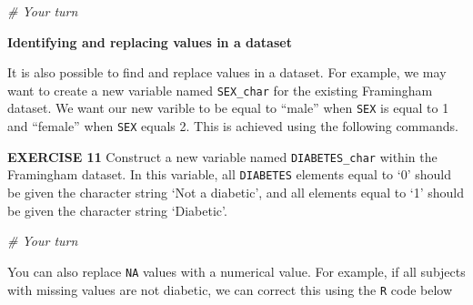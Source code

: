 \documentclass[
]{article}
\newenvironment{Shaded}{\begin{snugshade}}{\end{snugshade}}
\newcommand{\CommentTok}[1]{\textcolor[rgb]{0.56,0.35,0.01}{\textit{#1}}}
\newcommand{\DecValTok}[1]{\textcolor[rgb]{0.00,0.00,0.81}{#1}}
\newcommand{\FunctionTok}[1]{\textcolor[rgb]{0.00,0.00,0.00}{#1}}
\newcommand{\NormalTok}[1]{#1}
\newcommand{\OtherTok}[1]{\textcolor[rgb]{0.56,0.35,0.01}{#1}}
\newcommand{\SpecialCharTok}[1]{\textcolor[rgb]{0.00,0.00,0.00}{#1}}
\newcommand{\StringTok}[1]{\textcolor[rgb]{0.31,0.60,0.02}{#1}}
\begin{document}
\begin{Shaded}
\begin{Highlighting}[]
\CommentTok{\# Your turn}
\end{Highlighting}
\end{Shaded}

\textbf{Identifying and replacing values in a dataset}

It is also possible to find and replace values in a dataset. For
example, we may want to create a new variable named \texttt{SEX\_char}
for the existing Framingham dataset. We want our new varible to be equal
to ``male'' when \texttt{SEX} is equal to 1 and ``female'' when
\texttt{SEX} equals 2. This is achieved using the following commands.

\begin{Shaded}
\end{Shaded}

\textbf{EXERCISE 11} Construct a new variable named
\texttt{DIABETES\_char} within the Framingham dataset. In this variable,
all \texttt{DIABETES} elements equal to `0' should be given the
character string `Not a diabetic', and all elements equal to `1' should
be given the character string `Diabetic'.

\begin{Shaded}
\begin{Highlighting}[]
\CommentTok{\# Your turn}
\end{Highlighting}
\end{Shaded}

You can also replace \texttt{NA} values with a numerical value. For
example, if all subjects with missing values are not diabetic, we can
correct this using the \texttt{R} code below

\begin{Shaded}
\end{Shaded}
\end{document}

